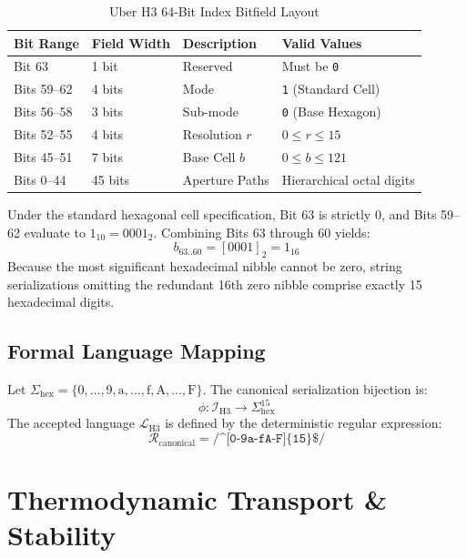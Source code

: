 \documentclass[10pt,journal,compsoc]{IEEEtran}
\begin{document}
\begin{table}[htbp]
\caption{Uber H3 64-Bit Index Bitfield Layout}
\label{tab:bitfield}
\centering
\begin{tabular}{@{}llll@{}}
\toprule
Bit Range & Field Width & Description & Valid Values \\ \midrule
Bit 63 & 1 bit & Reserved & Must be \texttt{0} \\
Bits 59--62 & 4 bits & Mode & \texttt{1} (Standard Cell) \\
Bits 56--58 & 3 bits & Sub-mode & \texttt{0} (Base Hexagon) \\
Bits 52--55 & 4 bits & Resolution $r$ & $0 \le r \le 15$ \\
Bits 45--51 & 7 bits & Base Cell $b$ & $0 \le b \le 121$ \\
Bits 0--44 & 45 bits & Aperture Paths & Hierarchical octal digits \\ \bottomrule
\end{tabular}
\end{table}

Under the standard hexagonal cell specification, Bit 63 is strictly $0$, and Bits 59--62 evaluate to $1_{10} = 0001_2$. Combining Bits 63 through 60 yields:
\begin{equation}
    b_{63..60} = [0001]_2 = 1_{16}
\end{equation}
Because the most significant hexadecimal nibble cannot be zero, string serializations omitting the redundant 16th zero nibble comprise exactly 15 hexadecimal digits.

\subsection{Formal Language Mapping}
Let $\Sigma_{\text{hex}} = \{0,\dots,9, \text{a},\dots,\text{f}, \text{A},\dots,\text{F}\}$. The canonical serialization bijection is:
\begin{equation}
    \phi: \mathcal{I}_{\text{H3}} \to \Sigma_{\text{hex}}^{15}
\end{equation}
The accepted language $\mathcal{L}_{\text{H3}}$ is defined by the deterministic regular expression:
\begin{equation}
    \mathcal{R}_{\text{canonical}} = \texttt{/\textasciicircum[0-9a-fA-F]\{15\}\$/}
\end{equation}

\section{Thermodynamic Transport \& Stability}
\end{document}
